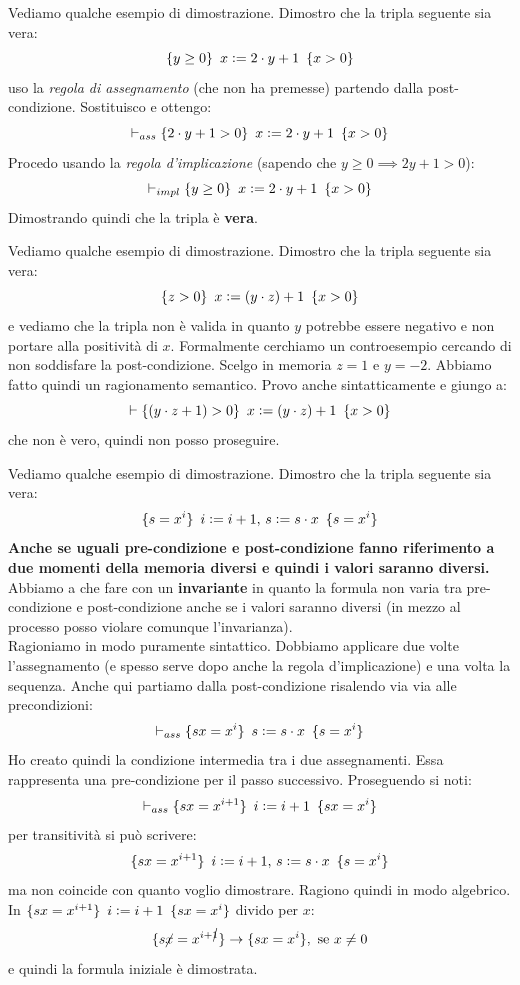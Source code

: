 \begin{esempio}
	Vediamo qualche esempio di dimostrazione. Dimostro che la tripla seguente sia
	vera:
	\[\{y\geq 0\}\,\,\,x\cceq 2\cdot y+1\,\,\,\{x>0\}\]
	uso la \emph{regola di assegnamento} (che non ha premesse) partendo dalla
	post-condizione. Sostituisco e ottengo:
	\[\vdash_{ass}\{2\cdot y+1> 0\}\,\,\,x\cceq 2\cdot y+1\,\,\,\{x>0\}\]
	Procedo usando la \emph{regola d'implicazione} (sapendo che $y\geq 0\implies
	2y+1>0$):
	\[\vdash_{impl}\{y\geq 0\}\,\,\,x\cceq 2\cdot y+1\,\,\,\{x>0\}\]
	Dimostrando quindi che la tripla è \textbf{vera}.
\end{esempio}
\begin{esempio}
	Vediamo qualche esempio di dimostrazione. Dimostro che la tripla seguente sia
	vera:
	\[\{z> 0\}\,\,\,x\cceq (y\cdot z)+1\,\,\,\{x>0\}\]
	e vediamo che la tripla non è valida in quanto $y$ potrebbe essere negativo e
	non portare alla positività di $x$. Formalmente cerchiamo un controesempio
	cercando di non soddisfare la post-condizione. Scelgo in memoria $z=1$ e
	$y=-2$. Abbiamo fatto quindi un ragionamento semantico. Provo anche
	sintatticamente e giungo a:
	\[\vdash\{(y\cdot z+1)> 0\}\,\,\,x\cceq (y\cdot z)+1\,\,\,\{x>0\}\]
	che non è vero, quindi non posso proseguire.
\end{esempio}
\begin{esempio}
	Vediamo qualche esempio di dimostrazione. Dimostro che la tripla seguente sia
	vera:
	\[\{s=x^i\}\,\,\,i\cceq i+1,\, s\cceq s\cdot x\,\,\,\{s=x^i\}\]
	\textbf{Anche se uguali pre-condizione e post-condizione fanno riferimento a due momenti
		della memoria diversi e quindi i valori saranno diversi.}\\
	Abbiamo a che fare con un \textbf{invariante} in quanto la formula non varia
	tra pre-condizione e post-condizione anche se i valori saranno diversi (in mezzo
	al processo posso violare comunque l'invarianza).\\
	Ragioniamo in modo puramente sintattico. Dobbiamo applicare due volte
	l'assegnamento (e spesso serve dopo anche la regola d'implicazione) e una
	volta la sequenza. Anche qui partiamo dalla post-condizione risalendo via via
	alle precondizioni:
	\[\vdash_{ass}\{sx=x^i\}\,\,\,s\cceq s\cdot x\,\,\,\{s=x^i\}\]
	Ho creato quindi la condizione intermedia tra i due assegnamenti. Essa rappresenta una pre-condizione per il passo successivo. Proseguendo si noti:
	\[\vdash_{ass}\{sx=x^{i+1}\}\,\,\,i\cceq i+1\,\,\,\{sx=x^i\}\]
	per transitività si può scrivere:
	\[\{sx=x^{i+1}\}\,\,\,i\cceq i+1,\, s\cceq s\cdot x\,\,\,\{s=x^i\}\]
	ma non coincide con quanto voglio dimostrare. Ragiono quindi in modo
	algebrico. In $\{sx=x^{i+1}\}\,\,\,i\cceq i+1\,\,\,\{sx=x^i\}$ divido per $x$:
	\[\{s\cancel{x}=x^{i+\cancel{1}}\}\to\{sx=x^i\},\mbox{ se }x\neq 0\]
	e quindi la formula iniziale è dimostrata.
\end{esempio}

